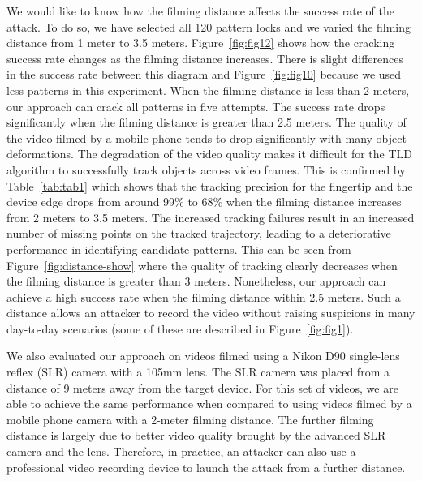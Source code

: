            We would like to know how the filming distance affects the
           success rate of the attack. To do so, we have selected all 120
           pattern locks and we varied the
           filming distance from 1 meter to 3.5 meters.
           Figure~\ref{fig:fig12} shows how the cracking success rate changes
           as the filming distance increases. There is slight differences in the success rate between this diagram and Figure~\ref{fig:fig10}
            because we used less patterns in this experiment.
           When the filming distance is less than 2 meters, our approach can crack all patterns in five attempts.
           The success rate drops significantly when
           the filming distance is greater than 2.5 meters.
           The quality of the video filmed by a mobile phone tends to drop significantly with many object deformations. The degradation of the video quality makes it difficult for the TLD algorithm to successfully track objects across video frames.
            This is confirmed by Table~\ref{tab:tab1}
           which shows that the tracking precision for the fingertip and the device edge drops from around 99\% to
           68\% when the filming
           distance increases from 2 meters to 3.5 meters. The increased
           tracking failures result in an increased number of missing
           points on the tracked trajectory, leading to a deteriorative performance in identifying candidate patterns.
           This can be seen from Figure~\ref{fig:distance-show} where the quality
           of tracking clearly decreases when the filming distance is greater
           than 3 meters.
           Nonetheless, our approach can
           achieve a high success rate when the filming distance within
           2.5 meters. Such a distance allows an attacker to
           record the video without raising suspicions in many day-to-day scenarios (some of these are
           described in Figure~\ref{fig:fig1}).

            We also evaluated our approach on videos filmed using a Nikon D90
            single-lens reflex (SLR) camera with a 105mm lens. The SLR camera
            was placed from a distance of 9 meters away from the target
            device. For this set of videos, we are able to achieve the same
            performance when compared to using videos filmed by a mobile
            phone camera with a 2-meter filming distance. The further filming
            distance is largely due to better video quality brought by the advanced
            SLR camera and the lens. Therefore, in practice, an attacker can
            also use a professional video recording device to launch the
            attack from a further distance.

